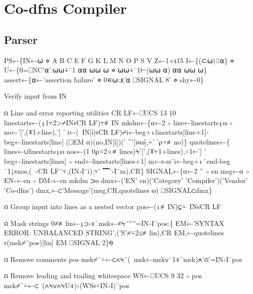 \documentclass{article}%
\begin{document}
\section{Co-dfns Compiler}

\subsection{Parser}

\nwenddocs{}\endmoddef\nwstartdeflinemarkup{}\nwenddeflinemarkup
 PS←\{IN←⍵ ⋄ A B C E F G K L M N O P S V Z←1+⍳15
         I←\{(⊂⍵)⌷⍺\} ⋄ U←\{0=⎕NC'⍺':⍵⍵⍣¯1 ⍺⍺ ⍵⍵ ⍵ ⋄ ⍵⍵⍣¯1⊢(⍵⍵ ⍺) ⍺⍺ ⍵⍵ ⍵\}
         assert←\{⍺←'assertion failure' ⋄ 0∊⍵:⍎'⍺ ⎕SIGNAL 8' ⋄ shy←0\}

         \LA{}Verify input from \code{}IN\edoc{}~{\nwtagstyle{}}\RA{}

⍝ Line and error reporting utilities
         CR LF←⎕UCS 13 10
         linestarts←(⍸1⍪2>⌿IN∊CR LF)⍪≢IN
         mkdm←\{⍺←2 ⋄ line←linestarts⍸⍵ ⋄ no←'[',(⍕1+line),'] '
                 i←(~IN[i]∊CR LF)⌿i←beg+⍳linestarts[line+1]-beg←linestarts[line]
                 (⎕EM ⍺)(no,IN[i])(' ^'[i∊⍵],⍨' '⍴⍨≢no)\}
         quotelines←\{
                 lines←∪linestarts⍸⍵
                 nos←(1 0⍴⍨2×≢lines)⍀'[',(⍕⍪1+lines),⍤1⊢'] '
                 beg←linestarts[lines] ⋄ end←linestarts[lines+1]
                 m←∊∘⍵¨i←beg+⍳¨end-beg
                 ¯1↓∊nos,(~∘CR LF¨⍪,(IN∘I¨i),⍪' ▔'∘I¨m),CR\}
         SIGNAL←\{⍺←2 '' ⋄ en msg←⍺ ⋄ EN∘←en ⋄ DM∘←en mkdm ⊃⍵
                 dmx←('EN' en)('Category' 'Compiler')('Vendor' 'Co-dfns')
                 dmx,←⊂'Message'(msg,CR,quotelines ⍵)
                 ⎕SIGNAL⊂dmx\}

⍝ Group input into lines as a nested vector
         pos←(⍳≢IN)⊆⍨~IN∊CR LF

⍝ Mask strings
         0≠≢lin←⍸⊃∘⌽¨msk←≠⍀¨''''=IN∘I¨pos:\{
                 EM←'SYNTAX ERROR: UNBALANCED STRING',('S'⌿⍨2≤≢lin),CR
                 EM,←quotelines ∊(msk⌿¨pos)[lin]
                 EM ⎕SIGNAL 2\}⍬

⍝ Remove comments
         pos msk⌿¨⍨←⊂∧⍀¨(~msk←msk∨¯1⌽¨msk)⍲'⍝'=IN∘I¨pos

⍝ Remove leading and trailing whitespace
         WS←⎕UCS 9 32 ⋄ pos msk⌿¨⍨←⊂~(∧⍀∨∧⍀U⌽)∘(WS∊⍨IN∘I)¨pos
\end{document}
